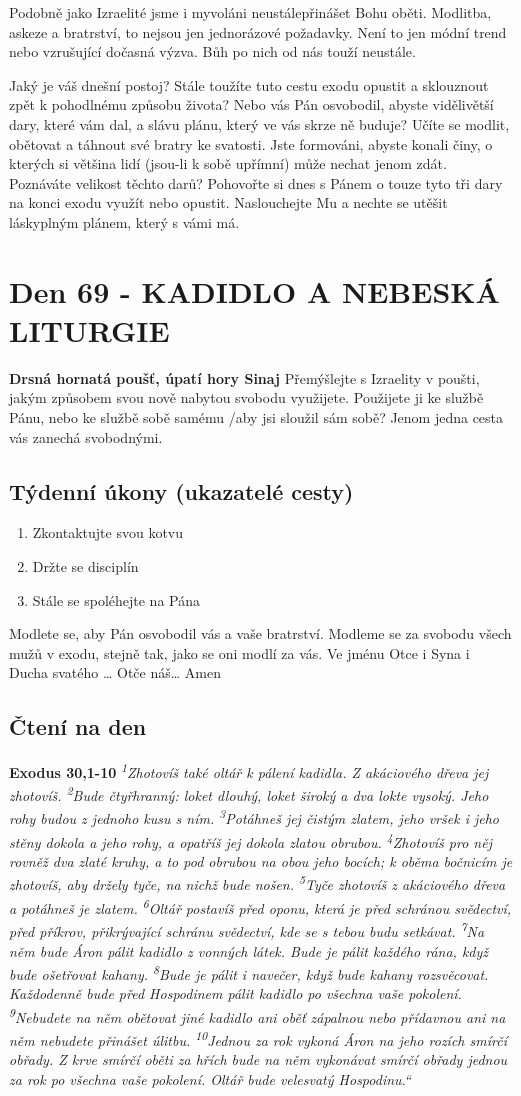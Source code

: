 \documentclass[11pt]{article}
\newcommand{\zacatekDesatyTyden}{
\textbf{Drsná hornatá poušť, úpatí hory Sinaj} \newline 
Přemýšlejte s Izraelity v poušti, jakým způsobem svou nově nabytou svobodu využijete. Použijete ji ke službě Pánu, nebo ke službě sobě samému /aby jsi sloužil sám sobě? Jenom jedna cesta vás zanechá svobodnými.

\subsection*{Týdenní úkony (ukazatelé cesty)}
\begin{enumerate}
  \item Zkontaktujte svou kotvu
  \item Držte se disciplín
  \item Stále se spoléhejte na Pána
\end{enumerate}
Modlete se, aby Pán osvobodil vás a vaše bratrství. \newline
Modleme se za svobodu všech mužů v exodu, stejně tak, jako se oni modlí za vás.\newline
Ve jménu Otce i Syna i Ducha svatého …  Otče náš… Amen
}
\begin{document}
Podobně jako Izraelité jsme i myvoláni neustálepřinášet Bohu oběti. Modlitba, askeze a bratrství, to nejsou jen
jednorázové požadavky. Není to jen módní trend nebo vzrušující dočasná výzva. Bůh po nich od nás touží neustále.

Jaký je váš dnešní postoj? Stále toužíte tuto cestu exodu opustit a sklouznout zpět k pohodlnému způsobu života? Nebo
vás Pán osvobodil, abyste vidělivětší dary, které vám dal, a slávu plánu, který ve vás skrze ně buduje? Učíte se modlit,
obětovat a táhnout své bratry ke svatosti. Jste formováni, abyste konali činy, o kterých si většina lidí (jsou-li k sobě
upřímní) může nechat jenom zdát. Poznáváte velikost těchto darů? Pohovořte si dnes s Pánem o touze tyto tři dary na
konci exodu využít nebo opustit. Naslouchejte Mu a nechte se utěšit láskyplným plánem, který s vámi má.





\newpage
\section{Den 69 - KADIDLO A NEBESKÁ LITURGIE }
\zacatekDesatyTyden
\subsection*{Čtení na den}
\textbf{Exodus 30,1-10}
\newline
\textit{
\textsuperscript{1}Zhotovíš také oltář k pálení kadidla. Z akáciového dřeva jej zhotovíš.
\textsuperscript{2}Bude čtyřhranný: loket dlouhý, loket široký a dva lokte vysoký. Jeho rohy budou z jednoho kusu s ním.
\textsuperscript{3}Potáhneš jej čistým zlatem, jeho vršek i jeho stěny dokola a jeho rohy, a opatříš jej dokola zlatou obrubou.
\textsuperscript{4}Zhotovíš pro něj rovněž dva zlaté kruhy, a to pod obrubou na obou jeho bocích; k oběma bočnicím je zhotovíš, aby držely tyče, na nichž bude nošen.
\textsuperscript{5}Tyče zhotovíš z akáciového dřeva a potáhneš je zlatem.
\textsuperscript{6}Oltář postavíš před oponu, která je před schránou svědectví, před příkrov, přikrývající schránu svědectví, kde se s tebou budu setkávat.
\textsuperscript{7}Na něm bude Áron pálit kadidlo z vonných látek. Bude je pálit každého rána, když bude ošetřovat kahany.
\textsuperscript{8}Bude je pálit i navečer, když bude kahany rozsvěcovat. Každodenně bude před Hospodinem pálit kadidlo po všechna vaše pokolení.
\textsuperscript{9}Nebudete na něm obětovat jiné kadidlo ani oběť zápalnou nebo přídavnou ani na něm nebudete přinášet úlitbu.
\textsuperscript{10}Jednou za rok vykoná Áron na jeho rozích smírčí obřady. Z krve smírčí oběti za hřích bude na něm vykonávat smírčí obřady jednou za rok po všechna vaše pokolení. Oltář bude velesvatý Hospodinu.“
}
\end{document}
